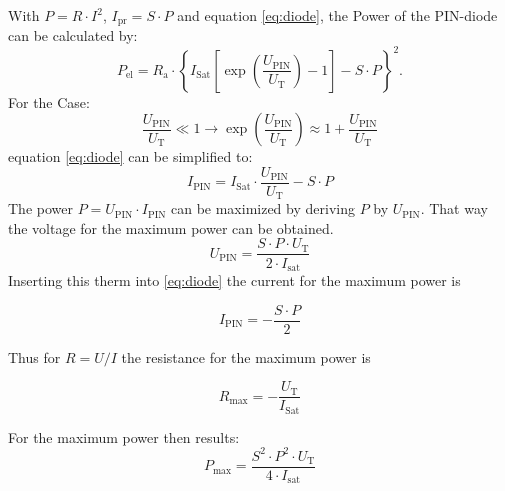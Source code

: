 With $P = R\cdot I^2$, $I_{\mathrm{pr}} = S\cdot P$ and equation \eqref{eq:diode}, the Power of the PIN-diode can be calculated by:
\begin{equation}
 P_{\mathrm{el}} = R_{\mathrm{a}}\cdot\left\{ I_{\mathrm{Sat}}\left[\exp\left(\frac{U_{\mathrm{PIN}}}{U_{\mathrm{T}}}\right)-1\right] -S\cdot P\right\}^2.
\label{eq:power}
\end{equation}
For the Case:
\begin{equation}
 \frac{U_{\mathrm{PIN}}}{U_{\mathrm{T}}} \ll 1 \to \exp\left(\frac{U_{\mathrm{PIN}}}{U_{\mathrm{T}}}\right)\approx1+\frac{U_{\mathrm{PIN}}}{U_{\mathrm{T}}}
\label{eq:vereinfachung}
\end{equation}
equation \eqref{eq:diode} can be simplified to:
%
\begin{equation}
I_{\mathrm{PIN}} = I_{\mathrm{Sat}}\cdot\frac{U_{\mathrm{PIN}}}{U_{\mathrm{T}}} -S\cdot P
\label{eq:}
\end{equation}
The power $P = U_{\mathrm{PIN}} \cdot I_{\mathrm{PIN}}$ can be maximized  by deriving $P$ by $U_{\mathrm{PIN}}$. That way the voltage for the maximum power can be obtained. 
\begin{equation}
U_{\mathrm{PIN}} = \frac{S\cdot P \cdot U_{\mathrm{T}}}{2\cdot I_{\mathrm{sat}}} 
\label{eq:}
\end{equation}
Inserting this therm into \eqref{eq:diode} the current for the maximum power is

\begin{equation}
I_{\mathrm{PIN}} = - \frac{S \cdot P}{2}
\label{eq:}
\end{equation}

Thus for $R = U/I$ the resistance for the maximum power is

\begin{equation}
R_{\mathrm{max}} = - \frac{U_{\mathrm{T}}}{I_{\mathrm{Sat}}}
\label{eq:}
\end{equation}

For the maximum power then results:
\begin{equation}
 P_{\mathrm{max}}= \frac{S^2\cdot P^2\cdot U_{\mathrm{T}}}{4 \cdot I_{\mathrm{sat}}}
\end{equation}

